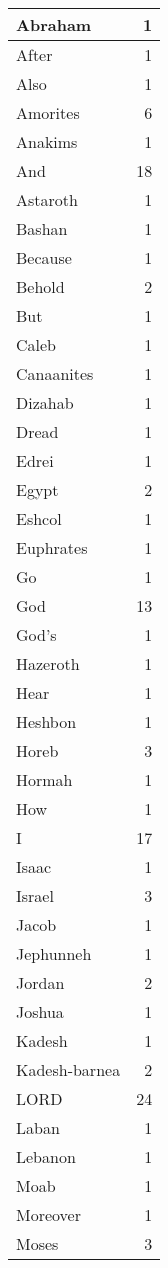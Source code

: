 \begin{center}
\begin{longtable}{l|r}
\hline \hline
\endlastfoot
Abraham & 1 \\ \hline
After & 1 \\ \hline
Also & 1 \\ \hline
Amorites & 6 \\ \hline
Anakims & 1 \\ \hline
And & 18 \\ \hline
Astaroth & 1 \\ \hline
Bashan & 1 \\ \hline
Because & 1 \\ \hline
Behold & 2 \\ \hline
But & 1 \\ \hline
Caleb & 1 \\ \hline
Canaanites & 1 \\ \hline
Dizahab & 1 \\ \hline
Dread & 1 \\ \hline
Edrei & 1 \\ \hline
Egypt & 2 \\ \hline
Eshcol & 1 \\ \hline
Euphrates & 1 \\ \hline
Go & 1 \\ \hline
God & 13 \\ \hline
God's & 1 \\ \hline
Hazeroth & 1 \\ \hline
Hear & 1 \\ \hline
Heshbon & 1 \\ \hline
Horeb & 3 \\ \hline
Hormah & 1 \\ \hline
How & 1 \\ \hline
I & 17 \\ \hline
Isaac & 1 \\ \hline
Israel & 3 \\ \hline
Jacob & 1 \\ \hline
Jephunneh & 1 \\ \hline
Jordan & 2 \\ \hline
Joshua & 1 \\ \hline
Kadesh & 1 \\ \hline
Kadesh-barnea & 2 \\ \hline
LORD & 24 \\ \hline
Laban & 1 \\ \hline
Lebanon & 1 \\ \hline
Moab & 1 \\ \hline
Moreover & 1 \\ \hline
Moses & 3 \\ \hline

\end{longtable}
\end{center}
